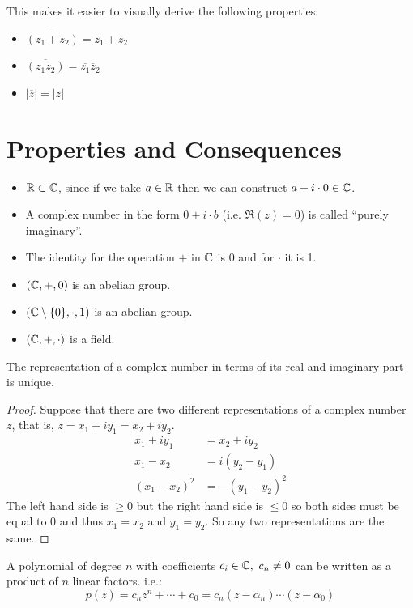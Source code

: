 \documentclass[../main.tex]{subfiles}
\begin{document}
This makes it easier to visually derive the following properties:
\begin{itemize}
  \item $\overline{(z_1 + z_2)} = \overline{z_1} + \overline{z}_{2}$
  \item $\overline{(z_1 z_2)} = \overline{z_1} \overline{z}_2$
  \item $|\overline{z}| = |z|$
\end{itemize}

\section{Properties and Consequences}
\begin{remark}
  \begin{itemize}
    \item $\mathbb{R} \subset \mathbb{C}$, since if we take $a \in \mathbb{R}$ then we can construct $a + i \cdot 0 \in \mathbb{C}$.
    \item A complex number in the form $0 + i \cdot b$ (i.e. $\Re(z) = 0$) is called ``purely imaginary''.
    \item The identity for the operation $+$ in $\mathbb{C}$ is 0 and for $\cdot$ it is 1.
    \item $(\mathbb{C}, +, 0)$ is an abelian group.
    \item $(\mathbb{C} \setminus \{0\}, \cdot, 1)$ is an abelian group.
    \item $(\mathbb{C}, +, \cdot)$ is a field.
  \end{itemize}
\end{remark}
\begin{proposition}
  The representation of a complex number in terms of its real and imaginary part is unique.
\end{proposition}
\begin{proof}
  Suppose that there are two different representations of a complex number $z$, that is, $z = x_1 + iy_1 = x_2 + iy_2$.
  \begin{align*}
    x_1 + iy_1 &= x_2 + iy_2 \\
    x_1 - x_2 &= i(y_2 - y_1) \\
    (x_1 - x_2)^2 &= -(y_1 - y_2)^2
  \end{align*}
  The left hand side is $\geq 0$ but the right hand side is $\leq 0$ so both sides must be equal to 0 and thus $x_1 = x_2$ and $y_1 = y_2$.
  So any two representations are the same.
\end{proof}
\begin{theorem}
  A polynomial of degree $n$ with coefficients $c_i \in \mathbb{C},\ c_n \neq 0$ can be written as a product of $n$ linear factors. i.e.:
  \[
    p(z) = c_n z^n + \cdots + c_0 = c_n(z - \alpha_n) \cdots (z - \alpha_0)
  \]
\end{theorem}
\end{document}
